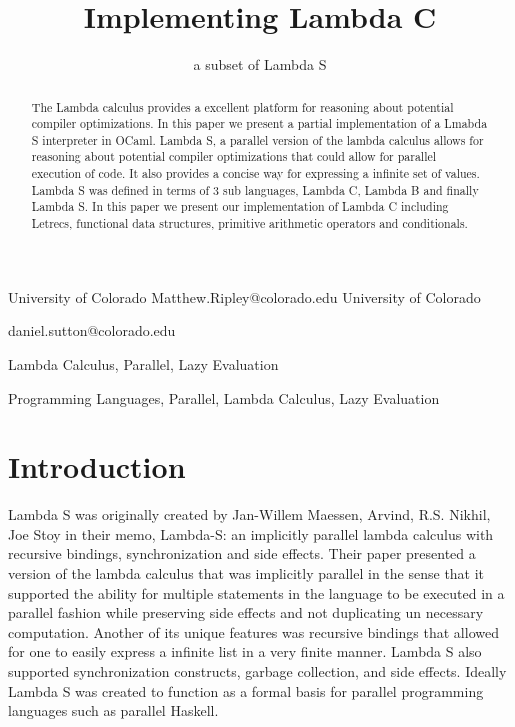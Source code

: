 \documentclass[preprint]{sigplanconf}
\begin{document}
\copyrightdata{[to be supplied]} 

\title{Implementing Lambda C}
\subtitle{a subset of Lambda S}

           {University of Colorado}
           {Matthew.Ripley@colorado.edu}
           {University of Colorado}
           {daniel.sutton@colorado.edu\begin{scriptsize}

\end{scriptsize}}

\maketitle

\begin{abstract}
The Lambda calculus provides a excellent platform for reasoning about potential compiler optimizations. In this paper we present a partial implementation of a Lmabda S interpreter in OCaml. Lambda S, a parallel version of the lambda calculus allows for reasoning about potential compiler optimizations that could allow for parallel execution of code. It also provides a concise way for expressing a infinite set of values. Lambda S was defined in terms of 3 sub languages, Lambda C, Lambda B and finally Lambda S. In this paper we present our implementation of Lambda C including Letrecs, functional data structures, primitive arithmetic operators and conditionals. 
\end{abstract}

\terms
Lambda Calculus, Parallel, Lazy Evaluation

\keywords
Programming Languages, Parallel, Lambda Calculus, Lazy Evaluation

\section{Introduction}
Lambda S was originally created by Jan-Willem Maessen, Arvind, R.S. Nikhil, Joe Stoy in their memo, Lambda-S: an implicitly parallel lambda calculus with recursive bindings, synchronization and side effects. Their paper presented a version of the lambda calculus that was implicitly parallel in the sense that it supported the ability for multiple statements in the language to be executed in a parallel fashion while preserving side effects and not duplicating un necessary computation. Another of its unique features was recursive bindings that allowed for one to easily express a infinite list in a very finite manner.  Lambda S also supported synchronization constructs, garbage collection, and side effects. Ideally Lambda S was created to function as a formal basis for parallel programming languages such as parallel Haskell. \citep{lambdas} 
\end{document}

